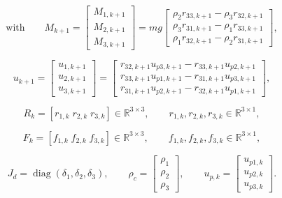 \begin{equation}
\text{with}\qquad
M_{k+1}
=
\begin{bmatrix}
M_{1,k+1}\\
M_{2,k+1}\\
M_{3,k+1}
\end{bmatrix}
=
mg
\begin{bmatrix}
\rho_2 r_{33,k+1}-\rho_3 r_{32,k+1}\\
\rho_3 r_{31,k+1}-\rho_1 r_{33,k+1}\\
\rho_1 r_{32,k+1}-\rho_2 r_{31,k+1}
\end{bmatrix},
\end{equation}

\begin{equation}
u_{k+1}
=
\begin{bmatrix}
u_{1,k+1}\\
u_{2,k+1}\\
u_{3,k+1}
\end{bmatrix}
=
\begin{bmatrix}
r_{32,k+1}u_{p3,k+1}-r_{33,k+1}u_{p2,k+1}\\
r_{33,k+1}u_{p1,k+1}-r_{31,k+1}u_{p3,k+1}\\
r_{31,k+1}u_{p2,k+1}-r_{32,k+1}u_{p1,k+1}
\end{bmatrix},
\end{equation}

\begin{equation}
R_k=[r_{1,k}\;r_{2,k}\;r_{3,k}]\in\mathbb{R}^{3\times 3},
\qquad
r_{1,k},r_{2,k},r_{3,k}\in\mathbb{R}^{3\times 1},
\end{equation}

\begin{equation}
F_k=[f_{1,k}\;f_{2,k}\;f_{3,k}]\in\mathbb{R}^{3\times 3},
\qquad
f_{1,k},f_{2,k},f_{3,k}\in\mathbb{R}^{3\times 1},
\end{equation}

\begin{equation}
J_d=\operatorname{diag}(\delta_1,\delta_2,\delta_3),
\qquad
\rho_c=
\begin{bmatrix}
\rho_1\\
\rho_2\\
\rho_3
\end{bmatrix},
\qquad
u_{p,k}=
\begin{bmatrix}
u_{p1,k}\\
u_{p2,k}\\
u_{p3,k}
\end{bmatrix}.
\end{equation}



